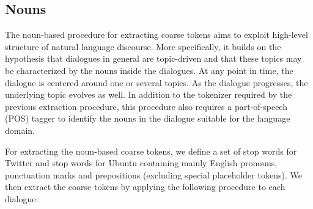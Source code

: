 \documentclass{article}
\begin{document}
\subsection*{Nouns}

The noun-based procedure for extracting coarse tokens aims to exploit high-level structure of natural language discourse. More specifically, it builds on the hypothesis that dialogues in general are topic-driven and that these topics may be characterized by the nouns inside the dialogues. At any point in time, the dialogue is centered around one or several topics. As the dialogue progresses, the underlying topic evolves as well. In addition to the tokenizer required by the previous extraction procedure, this procedure also requires a part-of-speech (POS) tagger to identify the nouns in the dialogue suitable for the language domain.

For extracting the noun-based coarse tokens, we define a set of  stop words for Twitter and  stop words for Ubuntu containing mainly English pronouns, punctuation marks and prepositions (excluding special placeholder tokens). We then extract the coarse tokens by applying the following procedure to each dialogue:
\end{document}
